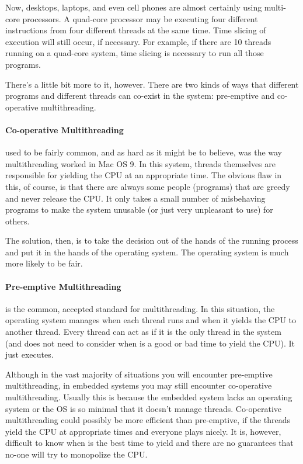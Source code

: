 Now, desktops, laptops, and even cell phones are almost certainly using multi-core processors. A quad-core processor may be executing four different instructions from four different threads at the same time. Time slicing of execution will still occur, if necessary. For example, if there are 10 threads running on a quad-core system, time slicing is necessary to run all those programs.

There's a little bit more to it, however. There are two kinds of ways that different programs and different threads can co-exist in the system: pre-emptive and co-operative multithreading.

\paragraph{Co-operative Multithreading} used to be fairly common, and as hard as it might be to believe, was the way multithreading worked in Mac OS 9. In this system, threads themselves are responsible for yielding the CPU at an appropriate time. The obvious flaw in this, of course, is that there are always some people (programs) that are greedy and never release the CPU. It only takes a small number of misbehaving programs to make the system unusable (or just very unpleasant to use) for others.

The solution, then, is to take the decision out of the hands of the running process and put it in the hands of the operating system. The operating system is much more likely to be fair.

\paragraph{Pre-emptive Multithreading} is the common, accepted standard for multithreading. In this situation, the operating system manages when each thread runs and when it yields the CPU to another thread. Every thread can act as if it is the only thread in the system (and does not need to consider when is a good or bad time to yield the CPU). It just executes.

Although in the vast majority of situations you will encounter pre-emptive multithreading, in embedded systems you may still encounter co-operative multithreading. Usually this is because the embedded system lacks an operating system or the OS is so minimal that it doesn't manage threads. Co-operative multithreading could possibly be more efficient than pre-emptive, if the threads yield the CPU at appropriate times and everyone plays nicely. It is, however, difficult to know when is the best time to yield and there are no guarantees that no-one will try to monopolize the CPU.

